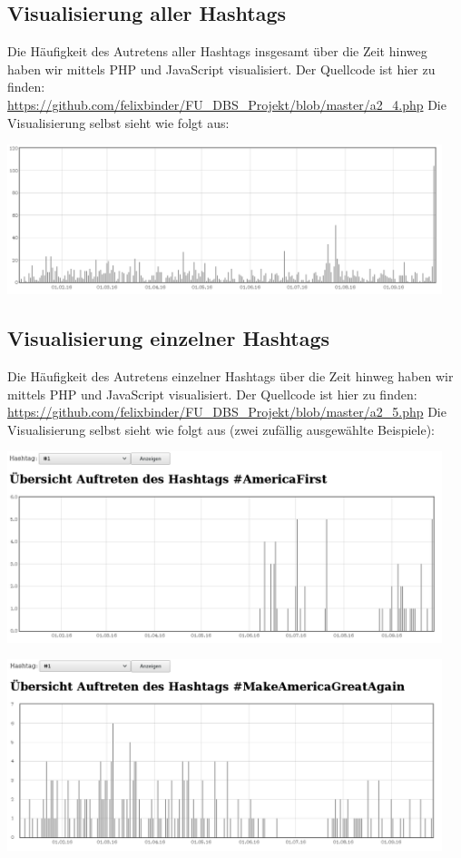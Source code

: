 \documentclass[BCOR0mm,fontsize=12pt,paper=a4,final,numbers=noenddot]{scrartcl}
\begin{document}
\subsection{Visualisierung aller Hashtags}

Die Häufigkeit des Autretens aller Hashtags insgesamt über die Zeit hinweg haben wir mittels PHP und JavaScript visualisiert. Der Quellcode ist hier zu finden: \url{https://github.com/felixbinder/FU_DBS_Projekt/blob/master/a2_4.php} Die Visualisierung selbst sieht wie folgt aus:

\includegraphics[width=0.95\textwidth]{a2_4.png}

\subsection{Visualisierung einzelner Hashtags}

Die Häufigkeit des Autretens einzelner Hashtags über die Zeit hinweg haben wir mittels PHP und JavaScript visualisiert. Der Quellcode ist hier zu finden: \url{https://github.com/felixbinder/FU_DBS_Projekt/blob/master/a2_5.php} Die Visualisierung selbst sieht wie folgt aus (zwei zufällig ausgewählte Beispiele):

\includegraphics[width=0.95\textwidth]{a2_5_1.png}

\includegraphics[width=0.95\textwidth]{a2_5_2.png}
\end{document}
